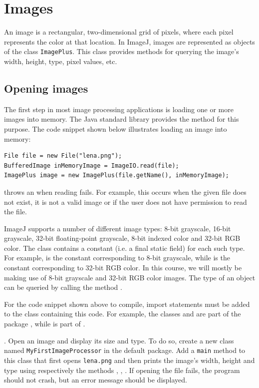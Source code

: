 \documentclass{book}
\begin{document}
\section{Images}
An image is a rectangular, two-dimensional grid of pixels, where each pixel represents the color at that location. In ImageJ, images are represented as objects of the class \texttt{ImagePlus}. This class provides methods for querying the image's width, height, type, pixel values, etc.

\subsection{Opening images}
The first step in most image processing applications is loading one or more images into memory. The Java standard library provides the method  for this purpose. The code snippet shown below illustrates loading an image into memory: 
\begin{lstlisting}
File file = new File("lena.png");
BufferedImage inMemoryImage = ImageIO.read(file);
ImagePlus image = new ImagePlus(file.getName(), inMemoryImage);
\end{lstlisting}
 throws an  when reading fails.  For example, this occurs when the given file does not exist, it is not a valid image or if the user does not have permission to read the file.

ImageJ supports a number of different image types: 8-bit grayscale, 16-bit grayscale, 32-bit floating-point grayscale, 8-bit indexed color and 32-bit RGB color. The class  contains a constant (i.e. a final static field) for each such type. For example,  is the constant corresponding to 8-bit grayscale, while  is the constant corresponding to 32-bit RGB color. In this course, we will mostly be making use of 8-bit grayscale and 32-bit RGB color images. The type of an  object can be queried by calling the method . 

For the code snippet shown above to compile, import statements must be added to the class containing this code. For example, the classes  and  are part of the package , while  is part of .

\begin{exercise}\label{ex:myfirstimageprocessor}.
Open an image and display its size and type. To do so, create a new class named \texttt{MyFirstImageProcessor} in the default package. Add a \texttt{main} method to this class that first opens \texttt{lena.png} and then prints the image's width, height and type using respectively the methods , , . If opening the file fails, the program should not crash, but an error message should be displayed.
\end{exercise}
\end{document}
